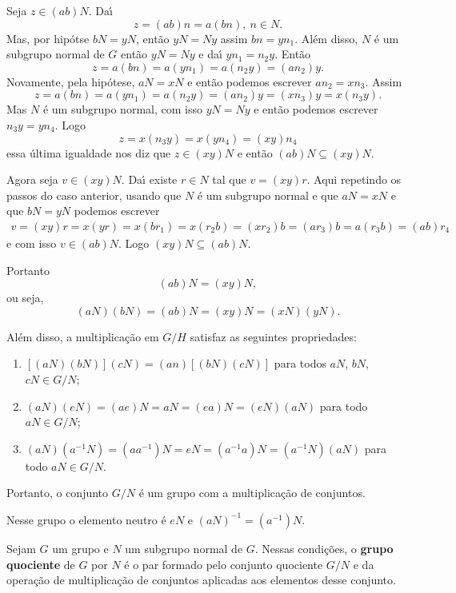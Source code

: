 Seja $z \in (ab)N$. Da{\'\i}
\[
    z = (ab)n = a(bn),\ n \in N.
\]
Mas, por hip\'otse $bN = yN$, ent\~ao $yN = Ny$ assim $bn = yn_1$. Al\'em disso, $N$ \'e um subgrupo normal de $G$ ent\~ao $yN = Ny$ e da{\'\i} $yn_1 = n_2y$. Ent\~ao
\[
    z = a(bn) = a(yn_1) = a(n_2y) = (an_2)y.
\]
Novamente, pela hip\'otese, $aN = xN$ e ent\~ao podemos escrever $an_2 = xn_3$. Assim
\[
    z = a(bn) = a(yn_1) = a(n_2y) = (an_2)y = (xn_3)y = x(n_3y).
\]
Mas $N$ \'e um subgrupo normal, com isso $yN = Ny$ e ent\~ao podemos escrever $n_3y = yn_4$. Logo
\[
    z = x(n_3y) = x(yn_4) = (xy)n_4
\]
essa \'ultima igualdade nos diz que $z \in (xy)N$ e ent\~ao $(ab)N \subseteq (xy)N$.

Agora seja $v \in (xy)N$. Da{\'\i} existe $r \in N$ tal que $v = (xy)r$. Aqui repetindo os passos do caso anterior, usando que $N$ \'e um subgrupo normal e que $aN = xN$ e que $bN = yN$ podemos escrever
\begin{align*}
    v = (xy)r = x(yr) = x(br_1) = x(r_2b) = (xr_2)b = (ar_3)b = a(r_3b) = (ab)r_4
\end{align*}
e com isso $v \in (ab)N$. Logo $(xy)N \subseteq (ab)N$.

Portanto
\[
    (ab)N = (xy)N,
\]
ou seja,
\[
    (aN)(bN) = (ab)N = (xy)N = (xN)(yN).
\]

Al\'em disso, a multiplica\c{c}\~ao em $G/H$ satisfaz as seguintes propriedades:

\begin{enumerate}[label={\roman*})]
    \item $[(aN)(bN)](cN) = (an)[(bN)(cN)]$ para todos $aN$, $bN$, $cN \in G/N$;

    \item $(aN)(eN) = (ae)N = aN = (ea)N = (eN)(aN)$ para todo $aN \in G/N$;

    \item $(aN)(a^{-1}N) = (aa^{-1})N = eN = (a^{-1}a)N = (a^{-1}N)(aN)$ para todo $aN \in G/N$.
\end{enumerate}

Portanto, o conjunto $G/N$ \'e um grupo com a multiplica\c{c}\~ao de conjuntos.

Nesse grupo o elemento neutro \'e $eN$ e $(aN)^{-1} = (a^{-1})N$.

\begin{definicao}
    Sejam $G$ um grupo e $N$ um subgrupo normal de $G$. Nessas condi\c{c}\~oes, o \textbf{grupo quociente}
    de $G$ por $N$ \'e o par formado pelo conjunto quociente $G/N$ e da opera\c{c}\~ao de multiplica\c{c}\~ao de conjuntos
    aplicadas aos elementos desse conjunto.
\end{definicao}

